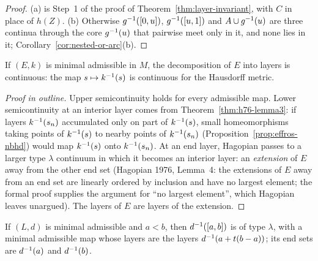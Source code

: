 \begin{proof}
(a) is Step~1 of the proof of Theorem~\ref{thm:layer-invariant}, with $C$ in place of $h(Z)$. (b) Otherwise $g^{-1}([0,u])$, $g^{-1}([u,1])$ and $A\cup g^{-1}(u)$ are three continua through the core $g^{-1}(u)$ that pairwise meet only in it,
and none lies in it; Corollary~\ref{cor:nested-or-arc}(b).
\end{proof}


\begin{theorem}\label{thm:h76-lemma5}
If $(E,k)$ is minimal admissible in $M$, the decomposition of $E$ into layers is continuous: the map $s\mapsto k^{-1}(s)$ is
continuous for the Hausdorff metric.
\end{theorem}

\begin{proof}[Proof in outline]
Upper semicontinuity holds for every admissible map. Lower semicontinuity at an interior layer comes from
Theorem~\ref{thm:h76-lemma3}: if layers $k^{-1}(s_n)$ accumulated only on part of $k^{-1}(s)$, small homeomorphisms
taking points of $k^{-1}(s)$ to nearby points of $k^{-1}(s_n)$ (Proposition~\ref{prop:effros-nbhd}) would map $k^{-1}(s)$
onto $k^{-1}(s_n)$. At an end layer, Hagopian passes to a larger type $\lambda$ continuum in which it becomes an
interior layer: an \emph{extension} of $E$ away from the other end set (Hagopian 1976, Lemma~4: the extensions of
$E$ away from an end set are linearly ordered by inclusion and have no largest element; the formal proof supplies the
argument for ``no largest element'', which Hagopian leaves unargued). The layers of $E$ are layers of the extension.
\end{proof}


\begin{corollary}[Restriction]\label{cor:restrict}
If $(L,d)$ is minimal admissible and $a<b$, then $d^{-1}([a,b])$ is of type $\lambda$, with a minimal admissible map
whose layers are the layers $d^{-1}(a+t(b-a))$; its end sets are $d^{-1}(a)$ and $d^{-1}(b)$.
\end{corollary}


